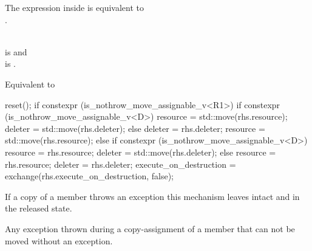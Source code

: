 \documentclass[ebook,11pt,article]{memoir}
\begin{document}
\begin{itemdescr}
\pnum
\remarks
The expression inside  is equivalent to \\
 \tcode{\&\&} .

\pnum
\requires \\ is 
and\\
 is .

\pnum
\effects Equivalent to
\begin{codeblock}
    reset();
    if constexpr (is_nothrow_move_assignable_v<R1>) {
        if constexpr (is_nothrow_move_assignable_v<D>) {
            resource = std::move(rhs.resource); 
            deleter  = std::move(rhs.deleter); 
        } else {
            deleter  = rhs.deleter; 
            resource = std::move(rhs.resource); 
        }
    } else {
        if constexpr (is_nothrow_move_assignable_v<D>) {
            resource = rhs.resource; 
            deleter  = std::move(rhs.deleter); 
        } else {
            resource = rhs.resource; 
            deleter  = rhs.deleter; 
        }
    }
    execute_on_destruction = exchange(rhs.execute_on_destruction, false);
\end{codeblock}

%

\pnum
\begin{note}
If a copy of a member throws an exception this mechanism leaves  intact and  in the released state.
\end{note}

\pnum
\throws Any exception thrown during a copy-assignment of a member that can not be moved without an exception.
\end{itemdescr}
\end{document}
